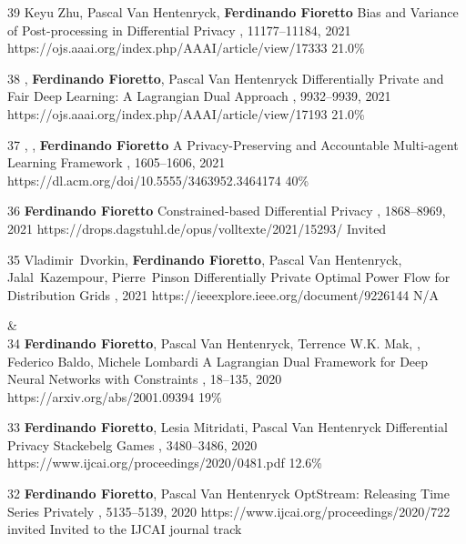 \begin{pubs}
	\confentry 
	{39} %
	{Keyu Zhu, Pascal Van Hentenryck, {\bf Ferdinando Fioretto}}
	{Bias and Variance of Post-processing in Differential Privacy}
	{\procAAAI, 11177--11184, 2021}
	{https://ojs.aaai.org/index.php/AAAI/article/view/17333}
    {21.0\%} %

	\confentry 
	{38} %
	{, {\bf Ferdinando Fioretto}, Pascal Van Hentenryck}
	{Differentially Private and Fair Deep Learning: A Lagrangian Dual Approach}
	{\procAAAI, 9932--9939, 2021}
	{https://ojs.aaai.org/index.php/AAAI/article/view/17193}
    {21.0\%} %

    \confentry
    {37} %
    {, , {\bf Ferdinando Fioretto}}
    {A Privacy-Preserving and Accountable Multi-agent Learning Framework}
    {\procAAMAS, 1605--1606, 2021}
    {https://dl.acm.org/doi/10.5555/3463952.3464174}
    {40\%}

	\confentry
	{36} %
	{\bf Ferdinando Fioretto}
	{Constrained-based Differential Privacy}
	{\procCP, 1868--8969, 2021}
	{https://drops.dagstuhl.de/opus/volltexte/2021/15293/}
	{Invited}
	
	\confentry 
	{35} %
	{Vladimir~Dvorkin, {\bf Ferdinando Fioretto}, Pascal Van Hentenryck, Jalal~Kazempour, Pierre~Pinson}
	{Differentially Private Optimal Power Flow for Distribution Grids}
	{, 2021}
	{https://ieeexplore.ieee.org/document/9226144}
	{N/A} %

{}&\nemph{\rule{0.5\linewidth}{0.5pt}}\\[1em]
	\confentry
		{34} %
		{{\bf Ferdinando Fioretto}, Pascal Van Hentenryck, Terrence W.K. Mak, , Federico Baldo, Michele Lombardi} 
		{A Lagrangian Dual Framework for Deep Neural Networks with Constraints}
		{\procECML, 18--135, 2020}
		{https://arxiv.org/abs/2001.09394}
		{19\%}

	\confentry
		{33} %
		{{\bf Ferdinando Fioretto}, Lesia Mitridati, Pascal Van Hentenryck}
		{Differential Privacy Stackebelg Games}
		{\procIJCAI, 3480--3486, 2020}
		{https://www.ijcai.org/proceedings/2020/0481.pdf}
	    {12.6\%}

	\confentryAwd
		{32} %
		{{\bf Ferdinando Fioretto}, Pascal Van Hentenryck}
		{OptStream: Releasing Time Series Privately}
		{\procIJCAI, 5135--5139, 2020}
	    {https://www.ijcai.org/proceedings/2020/722}
		{invited}
		{Invited to the IJCAI journal track}{}
	

\end{pubs}
